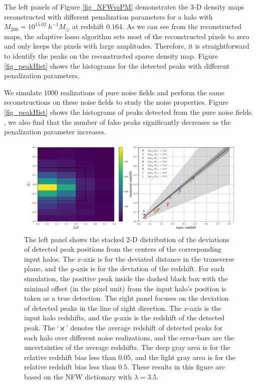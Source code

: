 The left panels of Figure \ref{fig_NFWvsPM} demonstrates the $3$-D density maps
reconstructed with different penalization parameters for a halo with
$M_{200}=10^{15.02} ~h^{-1}M_{\odot}$ at redshift $0.164$.  As we can see from
the reconstructed maps, the adaptive lasso algorithm sets most of the
reconstructed pixels to zero and only keeps the pixels with large amplitudes.
Therefore, it is straightforward to identify the peaks on the reconstructed
sparse density map.  Figure \ref{fig_peakHist} shows the histograms for the
detected peaks with different penalization parameters.

We simulate $1000$ realizations of pure noise fields and perform the
same reconstructions on these noise fields to study the noise properties. Figure
\ref{fig_peakHist} shows the histograms of peaks detected from the
pure noise fields. , we also find that the number of false
peaks significantly decreases as the penalization parameter increases.

\begin{figure}
 \centering
 \includegraphics[width=1.0\textwidth]{peak_scatters_NFW_lbd35.pdf}
 \caption{The left panel shows the stacked $2$-D distribution of the deviations
     of detected peak positions from the centers of the corresponding input
     halos. The $x$-axis is for the deviated distance in the transverse plane,
     and the $y$-axis is for the deviation of the redshift. For each
     simulation, the positive peak inside the dashed black box with the minimal
     offset (in the pixel unit) from the input halo's position is taken as a
     true detection. The right panel focuses on the deviation of detected peaks
     in the line of sight direction. The $x$-axis is the input halo redshifts,
     and the $y$-axis is the redshift of the detected peak. The `$\cross$'
     denotes the average redshift of detected peaks for each halo over
     different noise realizations, and the error-bars are the uncertainties of
     the average redshifts. The deep gray area is for the relative redshift
     bias less than $0.05$, and the light gray area is for the relative
     redshift bias less than $0.5$. These results in this figure are based on
     the NFW dictionary with $\lambda=3.5$.
     } \label{fig_detoffsets}
\end{figure}

